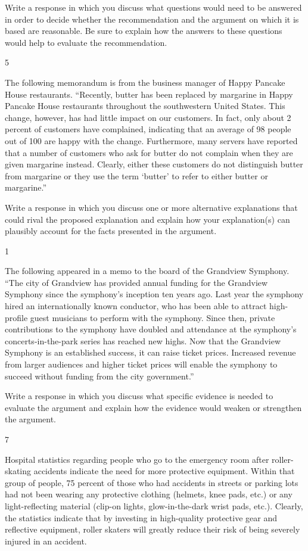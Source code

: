 \documentclass[]{article}
\begin{document}
Write a response in which you discuss what questions would need to be
answered in order to decide whether the recommendation and the argument
on which it is based are reasonable. Be sure to explain how the answers
to these questions would help to evaluate the recommendation.

5

The following memorandum is from the business manager of Happy Pancake
House restaurants. ``Recently, butter has been replaced by margarine in
Happy Pancake House restaurants throughout the southwestern United
States. This change, however, has had little impact on our customers. In
fact, only about 2 percent of customers have complained, indicating that
an average of 98 people out of 100 are happy with the change.
Furthermore, many servers have reported that a number of customers who
ask for butter do not complain when they are given margarine instead.
Clearly, either these customers do not distinguish butter from margarine
or they use the term `butter' to refer to either butter or margarine.''

Write a response in which you discuss one or more alternative
explanations that could rival the proposed explanation and explain how
your explanation(s) can plausibly account for the facts presented in the
argument.

1

The following appeared in a memo to the board of the Grandview Symphony.
``The city of Grandview has provided annual funding for the Grandview
Symphony since the symphony's inception ten years ago. Last year the
symphony hired an internationally known conductor, who has been able to
attract high-profile guest musicians to perform with the symphony. Since
then, private contributions to the symphony have doubled and attendance
at the symphony's concerts-in-the-park series has reached new highs. Now
that the Grandview Symphony is an established success, it can raise
ticket prices. Increased revenue from larger audiences and higher ticket
prices will enable the symphony to succeed without funding from the city
government.''

Write a response in which you discuss what specific evidence is needed
to evaluate the argument and explain how the evidence would weaken or
strengthen the argument.

7

Hospital statistics regarding people who go to the emergency room after
roller-skating accidents indicate the need for more protective
equipment. Within that group of people, 75 percent of those who had
accidents in streets or parking lots had not been wearing any protective
clothing (helmets, knee pads, etc.) or any light-reflecting material
(clip-on lights, glow-in-the-dark wrist pads, etc.). Clearly, the
statistics indicate that by investing in high-quality protective gear
and reflective equipment, roller skaters will greatly reduce their risk
of being severely injured in an accident.
\end{document}
